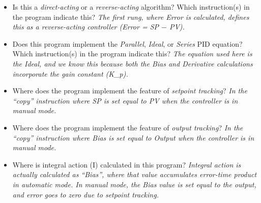 \begin{itemize}
\item{} Is this a {\it direct-acting} or a {\it reverse-acting} algorithm?  Which instruction(s) in the program indicate this? {\it The first rung, where Error is calculated, defines this as a reverse-acting controller (Error = SP $-$ PV).}
\vskip 10pt
\item{} Does this program implement the {\it Parallel}, {\it Ideal}, or {\it Series} PID equation?  Which instruction(s) in the program indicate this?  {\it The equation used here is the Ideal, and we know this because both the Bias and Derivative calculations incorporate the gain constant (K\_p).}
\vskip 10pt
\item{} Where does the program implement the feature of {\it setpoint tracking}?  {\it In the ``copy'' instruction where SP is set equal to PV when the controller is in manual mode.}
\vskip 10pt
\item{} Where does the program implement the feature of {\it output tracking}?  {\it In the ``copy'' instruction where Bias is set equal to Output when the controller is in manual mode.}
\vskip 10pt
\item{} Where is integral action (I) calculated in this program?  {\it Integral action is actually calculated as ``Bias'', where that value accumulates error-time product in automatic mode.  In manual mode, the Bias value is set equal to the output, and error goes to zero due to setpoint tracking.}
\end{itemize}





